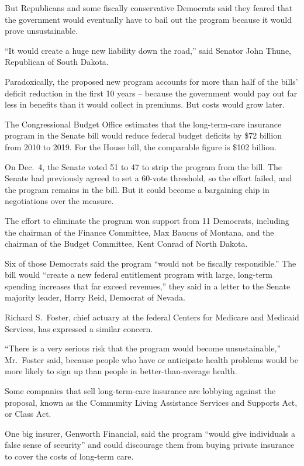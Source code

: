 ﻿\documentclass[12pt]{article}
\begin{document}
But Republicans and some fiscally conservative Democrats said they feared that the government would
eventually have to bail out the program because it would prove unsustainable.

``It would create a huge new liability down the road,'' said Senator John Thune, Republican of South
Dakota.

Paradoxically, the proposed new program accounts for more than half of the bills' deficit reduction
in the first 10 years -- because the government would pay out far less in benefits than it would
collect in premiums. But costs would grow later.

The Congressional Budget Office estimates that the long-term-care insurance program in the Senate
bill would reduce federal budget deficits by \$72 billion from 2010 to 2019. For the House bill, the
comparable figure is \$102 billion.

On Dec.~4, the Senate voted 51 to 47 to strip the program from the bill. The Senate had previously
agreed to set a 60-vote threshold, so the effort failed, and the program remains in the bill. But it
could become a bargaining chip in negotiations over the measure.

The effort to eliminate the program won support from 11 Democrats, including the chairman of the
Finance Committee, Max Baucus of Montana, and the chairman of the Budget Committee, Kent Conrad of
North Dakota.

Six of those Democrats said the program ``would not be fiscally responsible.'' The bill would
``create a new federal entitlement program with large, long-term spending increases that far exceed
revenues,'' they said in a letter to the Senate majority leader, Harry Reid, Democrat of Nevada.

Richard S.~Foster, chief actuary at the federal Centers for Medicare and Medicaid Services, has
expressed a similar concern.

``There is a very serious risk that the program would become unsustainable,'' Mr.~Foster said,
because people who have or anticipate health problems would be more likely to sign up than people in
better-than-average health.

Some companies that sell long-term-care insurance are lobbying against the proposal, known as the
Community Living Assistance Services and Supports Act, or Class Act.

One big insurer, Genworth Financial, said the program ``would give individuals a false sense of
security'' and could discourage them from buying private insurance to cover the costs of long-term
care.
\end{document}
